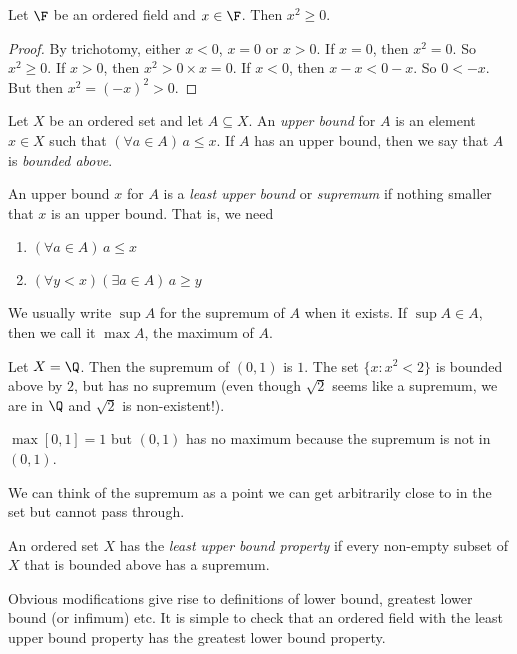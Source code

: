 \documentclass[a4paper]{article}
\begin{document}
\begin{lemma}
  Let $\F$ be an ordered field and $x\in \F$. Then $x^2 \geq 0$.
\end{lemma}

\begin{proof}
  By trichotomy, either $x < 0$, $x = 0$ or $x > 0$. If $x = 0$, then $x^2 = 0$. So $x^2 \geq 0$. If $x > 0$, then $x^2 > 0\times x = 0$. If $x < 0$, then $x - x < 0 - x$. So $0 < -x$. But then $x^2 = (-x)^2 > 0$.
\end{proof}

\begin{defi}
  Let $X$ be an ordered set and let $A\subseteq X$. An \emph{upper bound} for $A$ is an element $x\in X$ such that $(\forall a\in A)\,a \leq x$. If $A$ has an upper bound, then we say that $A$ is \emph{bounded above}.

  An upper bound $x$ for $A$ is a \emph{least upper bound} or \emph{supremum} if nothing smaller that $x$ is an upper bound. That is, we need
  \begin{enumerate}
    \item $(\forall a\in A)\,a \leq x$
    \item $(\forall y < x)(\exists a\in A)\,a \geq y$
  \end{enumerate}

  We usually write $\sup A$ for the supremum of $A$ when it exists. If $\sup A\in A$, then we call it $\max A$, the maximum of $A$.
\end{defi}

\begin{eg}
  Let $X = \Q$. Then the supremum of $(0, 1)$ is $1$. The set $\{x: x^2 < 2\}$ is bounded above by $2$, but has no supremum (even though $\sqrt{2}$ seems like a supremum, we are in $\Q$ and $\sqrt{2}$ is non-existent!).

  $\max [0, 1] = 1$ but $(0, 1)$ has no maximum because the supremum is not in $(0, 1)$.
\end{eg}

We can think of the supremum as a point we can get arbitrarily close to in the set but cannot pass through.

\begin{defi}
  An ordered set $X$ has the \emph{least upper bound property} if every non-empty subset of $X$ that is bounded above has a supremum.
\end{defi}

Obvious modifications give rise to definitions of lower bound, greatest lower bound (or infimum) etc. It is simple to check that an ordered field with the least upper bound property has the greatest lower bound property.
\end{document}
